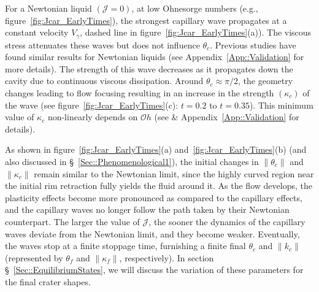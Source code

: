 \documentclass[final]{jfm}
\begin{document}
For a Newtonian liquid $\left(\mathcal{J} = 0\right)$, at low Ohnesorge numbers (e.g., figure~\ref{fig:Jcar_EarlyTimes}), the strongest capillary wave propagates at a constant velocity $V_\gamma$, dashed line in figure~\ref{fig:Jcar_EarlyTimes}(a)). The viscous stress attenuates these waves but does not influence $\theta_c$. Previous studies \citep{krishnan2017scaling, gordillo2019capillary} have found similar results for Newtonian liquids (see Appendix~\ref{App::Validation} for more details). The strength of this wave decreases as it propagates down the cavity due to continuous viscous dissipation. Around $\theta_c \approx \pi/2$, the geometry changes leading to flow focusing resulting in an increase in the strength $\left(\kappa_c\right)$ of the wave (see figure~\ref{fig:Jcar_EarlyTimes}(c): $t = 0.2$ to $t = 0.35$). This minimum value of $\kappa_c$ non-linearly depends on $\mathcal{O}h$ (see \citet{gordillo2019capillary} \& Appendix~\ref{App::Validation} for details).

As shown in figure~\ref{fig:Jcar_EarlyTimes}(a) and~\ref{fig:Jcar_EarlyTimes}(b) (and also discussed in \S~\ref{Sec::Phenomenological1}), the initial changes in $\|\theta_c\|$ and $\|\kappa_c\|$ remain similar to the Newtonian limit, since the highly curved region near the initial rim retraction fully yields the fluid around it. As the flow develops, the plasticity effects become more pronounced as compared to the capillary effects, and the capillary waves no longer follow the path taken by their Newtonian counterpart.
The larger the value of $\mathcal{J}$, the sooner the dynamics of the capillary waves deviate from the Newtonian limit, and they become weaker. Eventually, the waves stop at a finite stoppage time, furnishing a finite final $\theta_c$ and $\|k_c\|$ (represented by $\theta_f$ and $\|\kappa_f\|$, respectively). In section \S~\ref{Sec::EquilibriumStates}, we will discuss the variation of these parameters for the final crater shapes.
\end{document}
